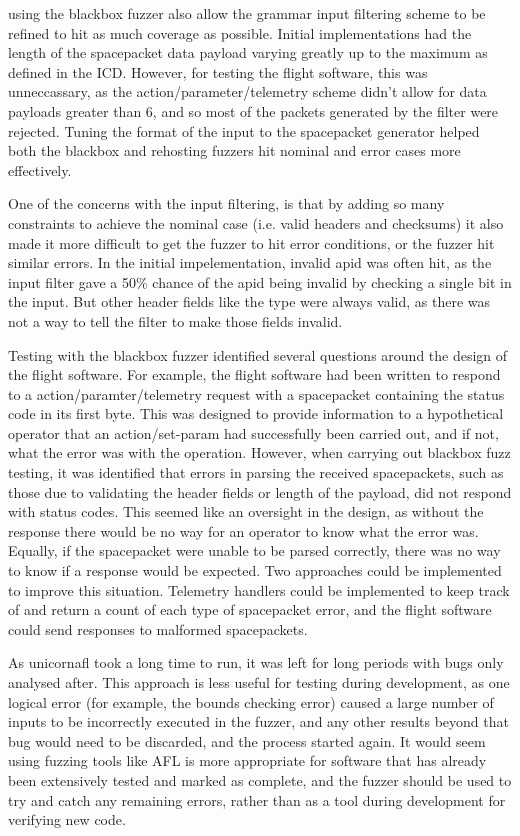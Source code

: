 \documentclass[../report.tex]{subfiles}
\begin{document}
using the blackbox fuzzer also allow the grammar input filtering scheme to be
refined to hit as much coverage as possible. Initial implementations had the
length of the spacepacket data payload varying greatly up to the maximum as
defined in the ICD. However, for testing the flight software, this was
unneccassary, as the action/parameter/telemetry scheme didn't allow for data
payloads greater than 6, and so most of the packets generated by the filter
were rejected. Tuning the format of the input to the spacepacket generator
helped both the blackbox and rehosting fuzzers hit nominal and error cases more
effectively.

One of the concerns with the input filtering, is that by adding so many
constraints to achieve the nominal case (i.e. valid headers and checksums) it
also made it more difficult to get the fuzzer to hit error conditions, or the
fuzzer hit similar errors. In the initial impelementation, invalid apid was
often hit, as the input filter gave a 50\% chance of the apid being invalid by
checking a single bit in the input. But other header fields like the type were
always valid, as there was not a way to tell the filter to make those fields
invalid.

Testing with the blackbox fuzzer identified several questions around the design
of the flight software. For example, the flight software had been written to
respond to a action/paramter/telemetry request with a spacepacket containing
the status code in its first byte. This was designed to provide information to
a hypothetical operator that an action/set-param had successfully been carried
out, and if not, what the error was with the operation. However, when carrying
out blackbox fuzz testing, it was identified that errors in parsing the
received spacepackets, such as those due to validating the header fields or
length of the payload, did not respond with status codes. This seemed like an
oversight in the design, as without the response there would be no way for an
operator to know what the error was. Equally, if the spacepacket were unable to
be parsed correctly, there was no way to know if a response would be expected.
Two approaches could be implemented to improve this situation. Telemetry
handlers could be implemented to keep track of and return a count of each type
of spacepacket error, and the flight software could send responses to malformed
spacepackets.

As unicornafl took a long time to run, it was left for long periods with bugs
only analysed after. This approach is less useful for testing during
development, as one logical error (for example, the bounds checking error)
caused a large number of inputs to be incorrectly executed in the fuzzer, and
any other results beyond that bug would need to be discarded, and the process
started again. It would seem using fuzzing tools like AFL is more appropriate
for software that has already been extensively tested and marked as complete,
and the fuzzer should be used to try and catch any remaining errors, rather
than as a tool during development for verifying new code.
\end{document}
